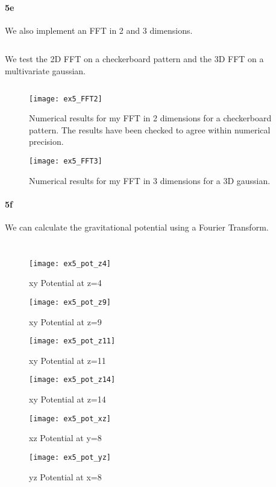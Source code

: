\paragraph{5e}
We also implement an FFT in 2 and 3 dimensions.

\inputminted[firstline=56, lastline=72]{Python}{../fft.py}

We test the 2D FFT on a checkerboard pattern and the 3D FFT on a multivariate gaussian.

\inputminted[firstline=84, lastline=138]{Python}{../ex5.py}

\begin{figure}[h]
  \centering
  \texttt{[image: ex5\_FFT2]}
  \caption{Numerical results for my FFT in 2 dimensions for a checkerboard pattern.
  The results have been checked to agree within numerical precision.}
\end{figure}

\begin{figure}[h]
  \centering
  \texttt{[image: ex5\_FFT3]}
  \caption{Numerical results for my FFT in 3 dimensions for a 3D gaussian.}
\end{figure}

\paragraph{5f}
We can calculate the gravitational potential using a Fourier Transform.

\inputminted[firstline=60, lastline=73]{Python}{../pm_utils.py}
\inputminted[firstline=140, lastline=158]{Python}{../ex5.py}

\begin{figure}[h]
  \centering
  \texttt{[image: ex5\_pot\_z4]}
  \caption{xy Potential at z=4}
\end{figure}
\begin{figure}[h]
  \centering
  \texttt{[image: ex5\_pot\_z9]}
  \caption{xy Potential at z=9}
\end{figure}
\begin{figure}[h]
  \centering
  \texttt{[image: ex5\_pot\_z11]}
  \caption{xy Potential at z=11}
\end{figure}
\begin{figure}[h]
  \centering
  \texttt{[image: ex5\_pot\_z14]}
  \caption{xy Potential at z=14}
\end{figure}


\begin{figure}[h]
  \centering
  \texttt{[image: ex5\_pot\_xz]}
  \caption{xz Potential at y=8}
\end{figure}
\begin{figure}[h]
  \centering
  \texttt{[image: ex5\_pot\_yz]}
  \caption{yz Potential at x=8}
\end{figure}

